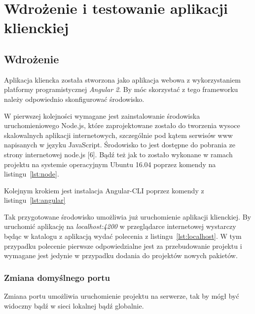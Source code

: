 \chapter{Wdrożenie i testowanie aplikacji klienckiej}

\section{Wdrożenie}

Aplikacja kliencka została stworzona jako aplikacja webowa z wykorzystaniem platformy programistycznej \textit{Angular 2}. By móc skorzystać z tego frameworku należy odpowiednio skonfigurować środowisko.

W pierwszej kolejności wymagane jest zainstalowanie środowiska uruchomieniowego Node.js, które zaprojektowane zostało do tworzenia wysoce skalowalnych aplikacji internetowych, szczególnie pod kątem serwisów www napisanych w języku JavaScript. \'Srodowisko to jest dostępne do pobrania ze strony internetowej node.js [6]. Bądź też jak to zostało wykonane w ramach projektu na systemie operacyjnym Ubuntu 16.04 poprzez komendy na listingu~\ref{lst:node}.

\lssetdef


Kolejnym krokiem jest instalacja Angular-CLI poprzez komendy z listingu~\ref{lst:angular}

\lssetdef


Tak przygotowane środowisko umożliwia już uruchomienie aplikacji klienckiej. By uruchomić aplikację na \textit{localhost:4200} w przeglądarce internetowej wystarczy będąc w katalogu z aplikacją wydać polecenia z listingu~\ref{lst:localhost}. W tym przypadku polecenie pierwsze odpowiedzialne jest za przebudowanie projektu i wymagane jest jedynie w przypadku dodania do projektów nowych pakietów.

\lssetdef


\subsection{Zmiana domyślnego portu}
Zmiana portu umożliwia uruchomienie projektu na serwerze, tak by mógł być widoczny bądź w sieci lokalnej bądź globalnie. \\

